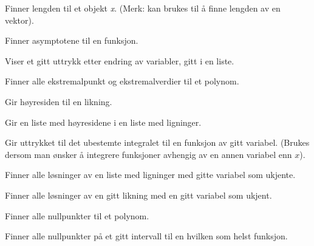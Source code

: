 \vs
\setlength{\parskip}{12 pt}
\renewcommand{\vsk}{\vspace{0 pt}}
\renewcommand\gvs{\vspace{1 pt}}
Finner lengden til et objekt \textit{x}. (Merk: kan brukes til å finne lengden av en vektor).

Finner asymptotene til en funksjon.

\avst

Viser et gitt uttrykk etter endring av variabler, gitt i en liste.

\der

\ekstpkt

Finner alle ekstremalpunkt og ekstremalverdier til et polynom.

\funk

Gir høyresiden til en likning.

Gir en liste med høyresidene i en liste med ligninger.

\intu

\intb

Gir uttrykket til det ubestemte integralet til en funksjon av gitt variabel. (Brukes dersom man ønsker å integrere funksjoner avhengig av en annen variabel enn $ x $).

\kurve

\kuler

\los

Finner alle løsninger av en liste med ligninger med gitte variabel som ukjente.

Finner alle løsninger av en gitt likning med en gitt variabel som ukjent.

\dif

\diff

\absmaks

\absmin

Finner alle nullpunkter til et polynom.

Finner alle nullpunkter på et gitt intervall til en hvilken som helst funksjon.

\plan

\pris

\punkt

\pyr

